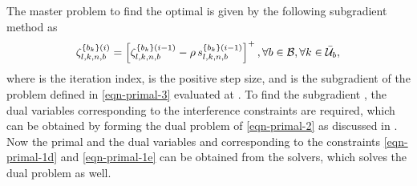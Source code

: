 The master problem to find the optimal  is given by the following subgradient method \cite{bertsekas1999nonlinear} as
\begin{equation} \label{primal-sg-update}
\zeta^{\set{b_k}(i)}_{l,k,n,b} = \left [\zeta_{l,k,n,b}^{\set{b_k}(i-1)} - \rho \, s_{l,k,n,b}^{\set{b_k}(i-1)} \right ]^+, \forall b \in \mc{B}, \forall k \in \bar{\mc{U}}_b,
\end{equation}
where  is the iteration index, \me{\rho} is the positive step size, and  is the subgradient of the problem defined in \eqref{eqn-primal-3} evaluated at . To find the subgradient , the dual variables corresponding to the interference constraints are required, which can be obtained by forming the dual problem of \eqref{eqn-primal-2} as discussed in \cite{pennanen2011decentralized}. Now the primal and the dual variables  and  corresponding to the constraints \eqref{eqn-primal-1d} and \eqref{eqn-primal-1e} can be obtained from the solvers, which solves the dual problem as well.

